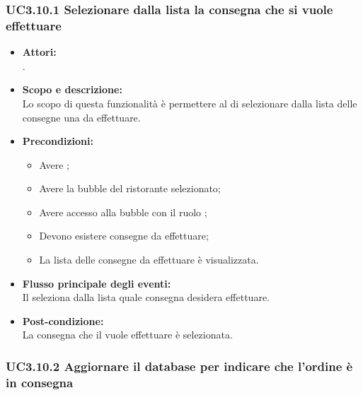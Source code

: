 \subsubsection{UC3.10.1 Selezionare dalla lista la consegna che si vuole effettuare} \label{UC3.10.1}

\begin{itemize}
	\item \textbf{Attori:}
	\\.
	\item \textbf{Scopo e descrizione:} 
	\\Lo scopo di questa funzionalità è permettere al  di selezionare dalla lista delle consegne una da effettuare.
	\item \textbf{Precondizioni:}
	\begin{itemize}
		\item Avere ;
		\item Avere la bubble del ristorante selezionato;
		\item Avere accesso alla bubble con il ruolo ;
		\item Devono esistere consegne da effettuare;
		\item La lista delle consegne da effettuare è visualizzata.
	\end{itemize}
	\item \textbf{Flusso principale degli eventi:}
	\\Il {} seleziona dalla lista quale consegna desidera effettuare.
	\item \textbf{Post-condizione:}
	\\La consegna che il  vuole effettuare è selezionata.
\end{itemize}

\subsubsection{UC3.10.2 Aggiornare il database per indicare che l’ordine è in consegna} \label{UC3.10.2}

